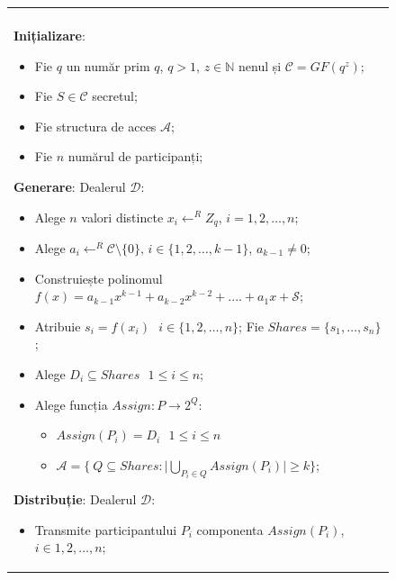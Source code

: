 \documentclass[oneside, 12pt]{book}
\begin{document}
\begin{figure}[h!]

\begin{tabular}{|p{\textwidth}|}
\hline

\\
\hspace{.1in}
\textbf{Inițializare}: 
	\begin{itemize}
		\item Fie $q$ un număr prim $q$, $q > 1$, $z \in \mathbb{N}$ nenul și $\mathcal{C} = GF(q^z)$;
		\item Fie $S \in \mathcal{C}$ secretul; 
		\item Fie structura de acces $\mathcal{A}$;
		\item Fie $n$ numărul de participanți;
	\end{itemize}

\medskip

\hspace{.1in}
\textbf{Generare}: Dealerul $\mathcal{D}$:
	\begin{itemize}
		\setlength{\itemsep}{5pt}
		\item Alege $n$ valori distincte $x_i \leftarrow^R Z_q \text{, }i = 1,2,\dots,n$;
		\item Alege $a_{i} \leftarrow^R \mathcal{C} \setminus \{0\} \text{, }i \in \{1,2,\dots,{k - 1}\}$, $a_{k-1} \neq 0$;
		\item Construiește polinomul $f(x) = a_{k - 1}x ^ {k-1} + a_{k-2}x ^ {k - 2} + .... + a_1x + \mathcal{S}$;
		\item Atribuie $s_i = f(x_i) \text{ } i \in \{1,2,\dots,n\}$; Fie $Shares = \{ s_1, \dots, s_n \}$;
		\item Alege $D_i \subseteq Shares \text{ } 1 \leq i \leq n$;
		\item Alege funcția $Assign: P \rightarrow 2^Q$:
			\begin{itemize}
				\item $Assign(P_i) = D_i \text{ } 1 \leq i \leq n$
				\item $\mathcal{A} = \bigg \{ \ Q \subseteq Shares: \bigg| \underset{P_i \in Q}{{\bigcup}} Assign(P_i) \bigg| \geq k \bigg \}$;
			\end{itemize}
	\end{itemize}
\medskip

\hspace{.1in}
\textbf{Distribuție}: Dealerul $\mathcal{D}$:
	\begin{itemize}
		\item Transmite participantului $P_i$ componenta $Assign(P_i)$, $i \in 1,2,\dots,n$;
	\end{itemize}


\end{tabular}
\end{figure}
\end{document}
